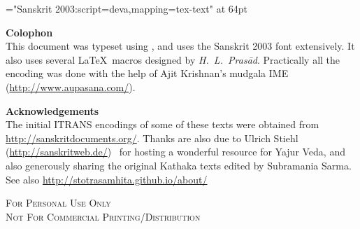 \thispagestyle{empty}\clearpage
\begin{titlepage}
\vspace*{6.5cm}
\begin{center}
{\font\x="Sanskrit 2003:script=deva,mapping=tex-text" at 64pt \x \titletext}
\end{center}
\end{titlepage}

\begin{center}
\parbox{10cm}{
{\Large \textbf{Colophon}}\\
\noindent This document was typeset using \XeLaTeX, and uses the Sanskrit 2003 font extensively. It also uses several \LaTeX\ macros designed by \textit{H.~L.~Prasād}. Practically all the encoding was done with the help of Ajit Krishnan's mudgala IME (\url{http://www.aupasana.com/}).
\vspace*{5cm}

{\large \textbf{Acknowledgements}}\\
The initial ITRANS encodings of some of these texts were obtained from \url{http://sanskritdocuments.org/}. Thanks are also due to Ulrich Stiehl~ (\url{http://sanskritweb.de/}) ~for hosting a wonderful resource for Yajur Veda, and also generously sharing the original Kathaka texts edited by Subramania Sarma. \\
See also \url{http://stotrasamhita.github.io/about/}
\vspace*{1cm}
%
\begin{center}
{\scshape{For Personal Use Only\\
 Not For Commercial Printing/Distribution}}
\end{center}
}
\end{center}
\clearemptydoublepage %
\setcounter{page}{0} %
\renewcommand{\chaptermark}[1]{%
\markboth{\large #1}{}} %
\begin{large}
\tableofcontents
\end{large}

\mbox{}
\clearpage
\thispagestyle{empty}
\clearemptydoublepage
